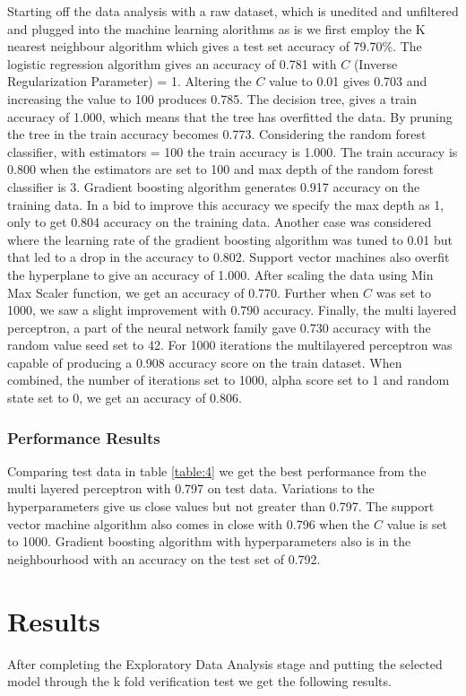 \documentclass[12pt]{article}
\begin{document}
Starting off the data analysis with a raw dataset, which is unedited and unfiltered and plugged into the machine learning alorithms as is we first employ the K nearest neighbour algorithm which gives a test set accuracy of 79.70\%. The logistic regression algorithm gives an accuracy of 0.781 with $C$ (Inverse Regularization Parameter) = 1. Altering the $C$ value to 0.01 gives 0.703 and increasing the value to 100 produces 0.785. The decision tree, gives a train accuracy of 1.000, which means that the tree has overfitted the data. By pruning the tree in the train accuracy becomes 0.773. Considering the random forest classifier, with estimators = 100 the train accuracy is 1.000. The train accuracy is 0.800 when the estimators are set to 100 and max depth of the random forest classifier is 3. Gradient boosting algorithm generates 0.917 accuracy on the training data. In a bid to improve this accuracy we specify the max depth as 1, only to get 0.804 accuracy on the training data. Another case was considered where the learning rate of the gradient boosting algorithm was tuned to 0.01 but that led to a drop in the accuracy to 0.802. Support vector machines also overfit the hyperplane to give an accuracy of 1.000. After scaling the data using Min Max Scaler function, we get an accuracy of 0.770. Further when $C$ was set to 1000, we saw a slight improvement with 0.790 accuracy. Finally, the multi layered perceptron, a part of the neural network family gave 0.730 accuracy with the random value seed set to 42. For 1000 iterations the multilayered perceptron was capable of producing a 0.908 accuracy score on the train dataset. When combined, the number of iterations set to 1000, alpha score set to 1 and random state set to 0, we get an accuracy of 0.806.

\subsubsection{Performance Results}
Comparing test data in table \ref{table:4} we get the best performance from the multi layered perceptron with 0.797 on test data. Variations to the hyperparameters give us close values but not greater than 0.797. The support vector machine algorithm also comes in close with 0.796 when the $C$ value is set to 1000. Gradient boosting algorithm with hyperparameters also is in the neighbourhood with an accuracy on the test set of 0.792.


\clearpage
\newpage
\section{Results}
After completing the Exploratory Data Analysis stage and putting the selected model through the k fold verification test we get the following results.
\end{document}
